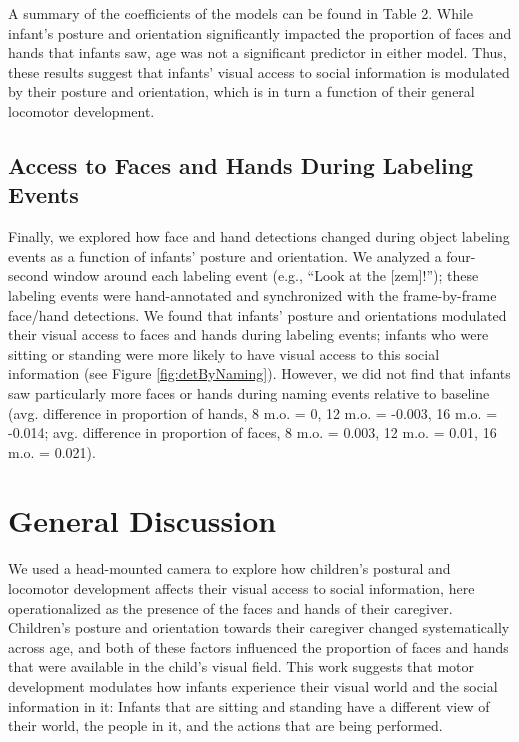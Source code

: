 \documentclass[10pt, letterpaper]{article}
\begin{document}
A summary of the coefficients of the models can be found in Table 2.
While infant's posture and orientation significantly impacted the
proportion of faces and hands that infants saw, age was not a
significant predictor in either model. Thus, these results suggest that
infants' visual access to social information is modulated by their
posture and orientation, which is in turn a function of their general
locomotor development.

\subsection{Access to Faces and Hands During Labeling
Events}\label{access-to-faces-and-hands-during-labeling-events}

Finally, we explored how face and hand detections changed during object
labeling events as a function of infants' posture and orientation. We
analyzed a four-second window around each labeling event (e.g., ``Look
at the {[}zem{]}!''); these labeling events were hand-annotated and
synchronized with the frame-by-frame face/hand detections. We found that
infants' posture and orientations modulated their visual access to faces
and hands during labeling events; infants who were sitting or standing
were more likely to have visual access to this social information (see
Figure \ref{fig:detByNaming}). However, we did not find that infants saw
particularly more faces or hands during naming events relative to
baseline (avg. difference in proportion of hands, 8 m.o. = 0, 12 m.o. =
-0.003, 16 m.o. = -0.014; avg. difference in proportion of faces, 8 m.o.
= 0.003, 12 m.o. = 0.01, 16 m.o. = 0.021).

\section{General Discussion}\label{general-discussion}

We used a head-mounted camera to explore how children's postural and
locomotor development affects their visual access to social information,
here operationalized as the presence of the faces and hands of their
caregiver. Children's posture and orientation towards their caregiver
changed systematically across age, and both of these factors influenced
the proportion of faces and hands that were available in the child's
visual field. This work suggests that motor development modulates how
infants experience their visual world and the social information in it:
Infants that are sitting and standing have a different view of their
world, the people in it, and the actions that are being performed.
\end{document}
